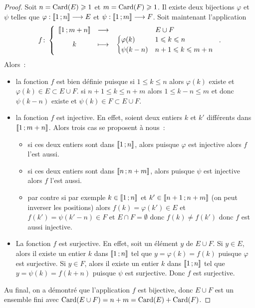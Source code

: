 \begin{proof}
  Soit \(n = \operatorname{Card}(E)\geqslant 1\) et \(m = \operatorname{Card}(F)\geqslant 1\). Il existe 
  deux bijections \(\varphi\) et \(\psi\) telles que 
  \(\varphi:\mathopen{\llbracket}1\mathclose{}\mathpunct{};n\mathclose{\rrbracket} \longrightarrow E\) et 
  \(\psi:\mathopen{\llbracket}1\mathclose{}\mathpunct{};m\mathclose{\rrbracket} \longrightarrow F\). Soit maintenant 
  l'application
  \begin{equation}
    f\colon \left\{\begin{array}{ccc} \mathopen{\llbracket}1\mathclose{}\mathpunct{};m + n\mathclose{\rrbracket} & \longrightarrow &E\cup F\\ k & \longmapsto & \begin{cases} 
        \varphi(k) & 1\leqslant k\leqslant n \\ \psi(k - n) & n + 1\leqslant 
    k\leqslant m + n\end{cases} \end{array} \right..
  \end{equation}
  Alors~:
  \begin{itemize}
    \item la fonction \(f\) est bien définie puisque si \(1\leqslant k \leqslant 
      n\) alors \(\varphi(k)\) existe et \(\varphi(k)\in E\subset E\cup F\). si 
      \(n + 1\leqslant k \leqslant n + m\) alors \(1\leqslant k - n \leqslant m\) et 
      donc \(\psi(k - n)\) existe et \(\psi(k)\in F\subset E\cup F\).
    \item la fonction \(f\) est injective. En effet, soient deux entiers \(k\) 
      et \(k'\) différents  dans \(\mathopen{\llbracket}1\mathclose{}\mathpunct{};m + n\mathclose{\rrbracket}\). Alors trois cas 
      se proposent à nous~:
      \begin{itemize}
        \item si ces deux entiers sont dans \(\mathopen{\llbracket}1\mathclose{}\mathpunct{};n\mathclose{\rrbracket}\), alors 
          puisque \(\varphi\) est injective alors \(f\) l'est aussi.
        \item si ces deux entiers sont dans \(\mathopen{\llbracket}n\mathclose{}\mathpunct{};n + m\mathclose{\rrbracket}\), alors 
          puisque \(\psi\) est injective alors \(f\) l'est aussi.
        \item par contre si par exemple \(k\in\mathopen{\llbracket}1\mathclose{}\mathpunct{};n\mathclose{\rrbracket}\) et 
          \(k'\in\mathopen{\llbracket}n + 1\mathclose{}\mathpunct{};n + m\mathclose{\rrbracket}\) (on peut inverser les positions) 
          alors \(f(k)=\varphi(k')\in E\) et \(f(k')=\psi(k'-n)\in F\) et 
          \(E\cap F = \emptyset\) donc \(f(k)\neq f(k')\) donc \(f\) est aussi 
          injective.
      \end{itemize}
    \item La fonction \(f\) est surjective. En effet, soit un élément \(y\) de 
      \(E\cup F\). Si \(y\in E\), alors il existe un entier \(k\) dans 
      \(\mathopen{\llbracket}1\mathclose{}\mathpunct{};n\mathclose{\rrbracket}\) tel que \(y = \varphi(k)=f(k)\) puisque 
      \(\varphi\) est surjective. Si \(y\in F\), alors il existe un entier \(k\) 
      dans \(\mathopen{\llbracket}1\mathclose{}\mathpunct{};n\mathclose{\rrbracket}\) tel que \(y = \psi(k)=f(k + n)\) puisque 
      \(\psi\) est surjective. Donc \(f\) est surjective.
  \end{itemize}
  Au final, on a démontré que l'application \(f\) est bijective, donc \(E\cup 
  F\) est un ensemble fini avec \(\operatorname{Card}(E\cup F)=n + m = \operatorname{Card}(E)+\operatorname{Card}(F)\).
\end{proof}

